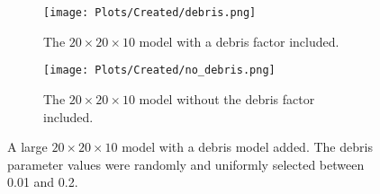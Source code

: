 \begin{figure}
    \centering
    \begin{subfigure}{1\linewidth}
        \centering
        \texttt{[image: Plots/Created/debris.png]}
        \caption{
            The $20\times20\times10$ model with a debris factor included. 
        }
        \label{fig:created:debris_model}
    \end{subfigure}
    \hfill
    \begin{subfigure}{1\linewidth}
        \centering
        \texttt{[image: Plots/Created/no\_debris.png]}
        \caption{
            The $20\times20\times10$ model without the debris factor included. 
        }
        \label{fig:created:no_debris_model}
    \end{subfigure}
    \caption{
        A large $20\times20\times10$ model with a debris model added. 
        The debris parameter values were randomly and uniformly selected between 0.01 and 0.2.
    }
    \label{fig:created:debris}
\end{figure}